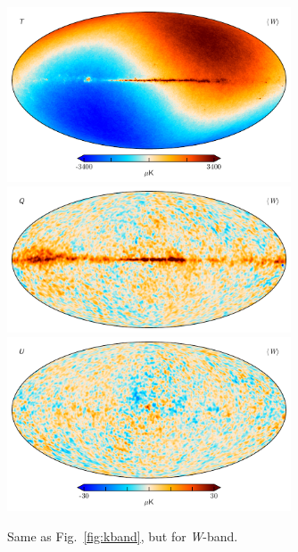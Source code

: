 \documentclass[twocolumn]{../../common/aa}
\newcommand{\W}[0]{\textit W}
\begin{document}
\begin{figure}
	\centering
	\includegraphics[width=0.75\textwidth]{figures/W_mu_I.pdf}
	\includegraphics[width=0.75\textwidth]{figures/W_mu_Q.pdf}
	\includegraphics[width=0.75\textwidth]{figures/W_mu_U.pdf}
        \caption{Same as Fig.~\ref{fig:kband}, but for \W-band.}                
	\label{fig:wband}
\end{figure}
\end{document}
